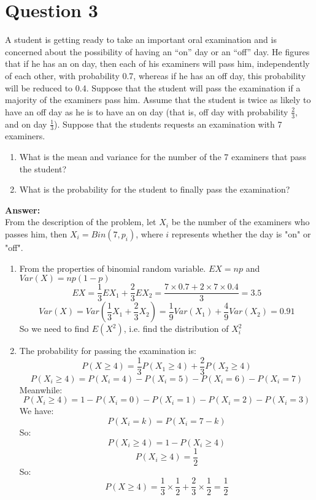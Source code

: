 \documentclass[hidelinks]{article}
\begin{document}
\section{Question 3}
A student is getting ready to take an important oral examination and is concerned
about the possibility of having an “on” day or an “off” day. He figures that if he has
an on day, then each of his examiners will pass him, independently of each other, with
probability 0.7, whereas if he has an off day, this probability will be reduced to 0.4.
Suppose that the student will pass the examination if a majority of the examiners pass
him. Assume that the student is twice as likely to have an off day as he is to have an on
day (that is, off day with probability $\frac{2}{3}$, and on day $\frac{1}{3}$). Suppose that the students requests an examination with 7 examiners.
\begin{enumerate}
    \item  What is the mean and variance for the number of the 7 examiners that pass the
student?
    \item  What is the probability for the student to finally pass the examination?
\end{enumerate}
\textbf{Answer:}\\
From the description of the problem, let $X_i$ be the number of the examiners who passes him, then $X_i = Bin(7, p_i)$, where $i$ represents whether the day is "on" or "off".
\begin{enumerate}
    \item From the properties of binomial random variable. $EX = np$ and $Var(X) = np(1-p)$
    $$EX = \frac{1}{3}EX_1 + \frac{2}{3}EX_2 = \frac{7\times 0.7 + 2\times 7\times 0.4}{3} = 3.5 $$
    $$Var(X) = Var(\frac{1}{3}X_1 + \frac{2}{3}X_2) = \frac{1}{9}Var(X_1) + \frac{4}{9}Var(X_2) = 0.91$$
    So we need to find $E(X^2)$, i.e. find the distribution of $X_i^2$

    \item The probability for passing the examination is:
    $$P(X \geq 4) = \frac{1}{3}P(X_1 \geq 4) + \frac{2}{3}P(X_2 \geq 4)$$
    $$P(X_i \geq 4) = P(X_i = 4) - P(X_i = 5) - P(X_i = 6) - P(X_i =7)$$
    Meanwhile:
    $$P(X_i \geq 4) = 1 - P(X_i = 0) - P(X_i = 1) - P(X_i = 2) - P(X_i =3)$$
    We have:
    $$ P(X_i = k) = P(X_i = 7-k)$$
    So:
    $$P(X_i \geq 4) = 1 - P(X_i \geq 4)$$
    $$P(X_i \geq 4) = \frac{1}{2}$$
    So:
    $$P(X \geq 4) = \frac{1}{3}\times \frac{1}{2} + \frac{2}{3}\times \frac{1}{2} = \frac{1}{2}$$
\end{enumerate}
\end{document}
